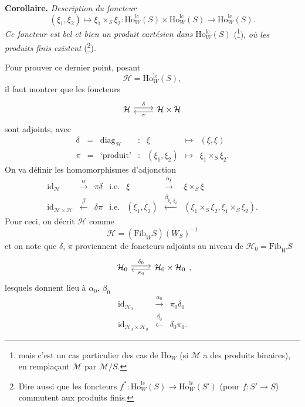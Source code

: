 \documentclass[11pt]{article}
\newcommand{\printedpage}[1]{\marginpar{\footnotesize p.~#1}}
\newcommand{\msp}[1]{\marginpar{\footnotesize [#1]}}
\newcommand{\Ho}{\mathrm{Ho}}
\newcommand{\lc}{\mathrm{lc}}
\newcommand{\uFib}{\underline{\mathrm{Fib}}}
\begin{document}
\setcounter{footnote}{131}

\printedpage{160}

\msp{page 247}

\textbf{Corollaire.} {\itshape Description du foncteur
\[
(\xi_1,\xi_2)\longmapsto\xi_1\times_S\xi_2 : \Ho^{\lc}_W(S)\times\Ho^{\lc}_W(S)\longrightarrow\Ho^{\lc}_W(S).
\]
Ce foncteur est bel et bien un produit cartésien dans} $\Ho^{\lc}_W(S)$ (\footnote{mais c'est un cas particulier des cas de $\Ho_W$ (si $\mathcal{M}$ a des produits binaires), en remplaçant $\mathcal{M}$ par $\mathcal{M}/S$.}), {\itshape où les produits finis existent} (\footnote{Dire aussi que les foncteurs $f^* : \Ho^{\lc}_W(S)\longrightarrow\Ho^{\lc}_W(S')$ (pour $f : S'\longrightarrow S$) commutent aux produits finis.}).

Pour prouver ce dernier point, posant
\[
\mathcal{H}=\Ho^{\lc}_W(S),
\]
il faut montrer que les foncteurs
\[
\begin{tikzcd}[ampersand replacement=\&]
\mathcal{H} \arrow[r, shift left, "\delta"] \& \mathcal{H}\times\mathcal{H} \arrow[l, shift left, "\pi"]
\end{tikzcd}
\]
sont adjoints, avec
\[
\begin{array}{rclcrcl}
\delta & = & \mathrm{diag}_{\mathcal{H}} & : & \xi & \longmapsto & (\xi,\xi)\\
\pi & = & \text{`produit'} & : & (\xi_1,\xi_2) & \longmapsto & \xi_1\times_S\xi_2.
\end{array}
\]
On va définir les homomorphismes d'adjonction
\[
\begin{array}{rcllrcl}
\mathrm{id}_{\mathcal{H}} & \xrightarrow{\alpha} & \pi\delta & \text{i.e.} & \xi & \xrightarrow{\alpha_\xi} & \xi\times_S\xi\\
\mathrm{id}_{\mathcal{H}\times\mathcal{H}} & \xleftarrow{\beta} & \delta\pi & \text{i.e.} & (\xi_1,\xi_2) & \xleftarrow{\beta_{\xi_1,\xi_2}} & (\xi_1\times_S\xi_2,\xi_1\times_S\xi_2).
\end{array}
\]
Pour ceci, on décrit $\mathcal{H}$ comme
\[
\mathcal{H}=(\uFib_W S)(W_S)^{-1}
\]
et on note que $\delta$, $\pi$ proviennent de foncteurs adjoints au niveau de $\mathcal{H}_0=\uFib_W S$
\[
\begin{tikzcd}[ampersand replacement=\&]
\mathcal{H}_0 \arrow[r, shift left, "\delta_0"] \& \mathcal{H}_0\times\mathcal{H}_0 \arrow[l, shift left, "\pi_0"]
\end{tikzcd},
\]
lesquels donnent lieu à $\alpha_0$, $\beta_0$
\[
\begin{array}{rcl}
\mathrm{id}_{\mathcal{H}_0} & \xrightarrow{\alpha_0} & \pi_0\delta_0\\
\mathrm{id}_{\mathcal{H}_0\times\mathcal{H}_0} & \xleftarrow{\beta_0} & \delta_0\pi_0.
\end{array}
\]
\end{document}
